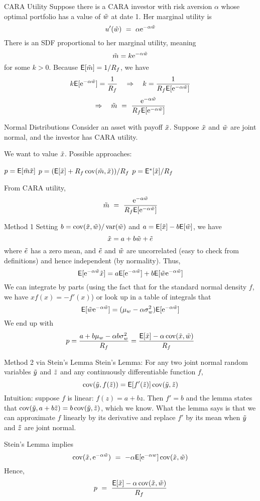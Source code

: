 \documentclass[xcolor=dvipsnames,10pt]{beamer}
\begin{document}
\begin{frame}{CARA Utility}
Suppose there is a CARA investor with risk aversion $\alpha$ whose optimal portfolio has a value of $\tilde{w}$ at date 1. 
Her marginal utility is
$$u'(\tilde{w}) \ = \ \alpha \mathrm{e}^{-\alpha \tilde{w}}$$
There is an SDF proportional to her marginal utility, \alert{meaning
$$\tilde{m}  =k \mathrm{e}^{-\alpha \tilde{w}}$$
for some $k>0$.  
Because $\mathsf{E}[\tilde{m}]=1/R_f$, we have
$$k \mathsf{E}[\mathrm{e}^{-\alpha \tilde{w}}] = \frac{1}{R_f} \quad \Rightarrow \quad k = \frac{1}{R_f \mathsf{E}[\mathrm{e}^{-\alpha \tilde{w}}]}$$ 
$$\Rightarrow \quad \tm \ = \ \frac{\E^{-\alpha \tw}}{R_f \mye[\E^{-\alpha \tw}]}$$}
\end{frame}

\begin{frame}{Normal Distributions}
Consider an asset with payoff $\tilde{x}$.  Suppose $\tilde{x}$ and $\tilde{w}$ are joint normal, and the investor has CARA utility.

We want to value $\tilde{x}$.  Possible approaches:
\begin{enumerate}
\im $p = \mathsf{E}[\tilde{m}\tilde{x}]$
\im $p = (\mathsf{E}[\tilde{x}] + R_f\operatorname{cov}(\tilde{m},\tilde{x}))/R_f$
\im $p = \mathsf{E}^*[\tilde{x}] / R_f$
\end{enumerate}
From CARA utility,
$$\tm \ = \ \frac{\E^{-\alpha \tw}}{R_f \mye[\E^{-\alpha \tw}]}$$
\end{frame}

\begin{frame}{Method 1}
    Setting \alert{$b=\operatorname{cov}(\tilde{x},\tilde{w})/\operatorname{var}(\tilde{w})$} and $a=\mathsf{E}[\tilde{x}]-b\mathsf{E}[\tilde{w}]$, we have
    $$\tilde{x} = a + b\tilde{w} + \tilde{e}$$
    where $\tilde{e}$ has a zero mean, and $\tilde{e}$ and $\tilde{w}$ are uncorrelated (easy to check from definitions) and hence independent (by normality).
    Thus,
    $$\mathsf{E}[\mathrm{e}^{-\alpha \tilde{w}}\tilde{x}] = a\mathsf{E}[\mathrm{e}^{-\alpha \tilde{w}}] + b\mathsf{E}[\tilde{w} \mathrm{e}^{-\alpha \tilde{w}}]$$
    We can integrate by parts (using the fact that for the standard normal density $f$, we have $xf(x) = - f'(x)$) or look up in a table of integrals that
    $$\mathsf{E}[\tilde{w} \mathrm{e}^{-\alpha \tilde{w}}] = (\mu_w-\alpha \sigma_w^2)\mathsf{E}[\mathrm{e}^{-\alpha \tilde{w}}]$$
    We end up with 
    $$p = \frac{a + b \mu_w - \alpha b \sigma_w^2}{R_f} = \frac{\mathsf{E}[\tilde{x}] - \alpha \operatorname{cov}(\tilde{x},\tilde{w})}{R_f}$$
    \end{frame}
\begin{frame}{Method 2 via Stein's Lemma}
Stein's Lemma: For any two joint normal random variables $\tilde{y}$ and $\tilde{z}$ and any continuously differentiable function $f$, 
$$\operatorname{cov}(\tilde{y}, f(\tilde{z})) = \mathsf{E}[f'(\tilde{z})]\operatorname{cov}(\tilde{y},\tilde{z})$$
Intuition: suppose $f$ is linear: $f(z) = a + bz$. Then $f'=b$ and the lemma states that $\operatorname{cov}(\tilde{y},a+b\tilde{z}) = b\operatorname{cov}(\tilde{y},\tilde{z})$, which we know.  What the lemma says is that we can approximate $f$ linearly by its derivative and replace $f'$ by its mean when $\tilde{y}$ and $\tilde{z}$ are joint normal.

Stein's Lemma implies
$$\operatorname{cov}(\tilde{x},\mathrm{e}^{-\alpha \tilde{w}}) \ = \ -\alpha \mathsf{E}[\mathrm{e}^{-\alpha w}]\operatorname{cov}(\tilde{x},\tilde{w})$$
Hence,
$$p \ = \ \frac{\mathsf{E}[\tilde{x}] - \alpha \operatorname{cov}(\tilde{x},\tilde{w})}{R_f}$$
\end{frame}
\end{document}
